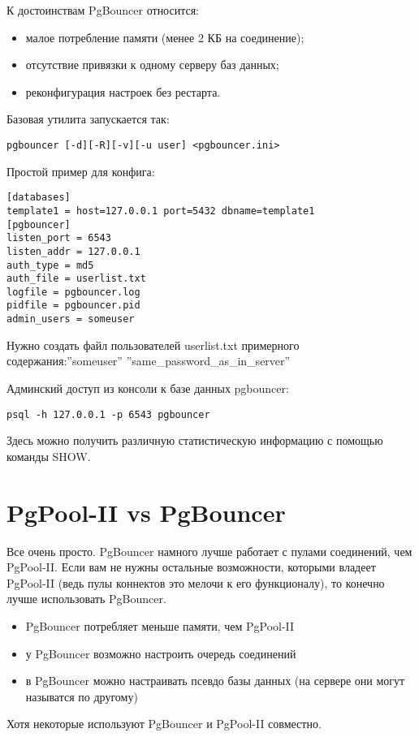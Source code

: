 К достоинствам PgBouncer относится:
\begin{itemize}
\item малое потребление памяти (менее 2 КБ на соединение);
\item отсутствие привязки к одному серверу баз данных;
\item реконфигурация настроек без рестарта.
\end{itemize}

Базовая утилита запускается так:
\begin{lstlisting}[label=lst:pgbouncer1,caption=PgBouncer]
pgbouncer [-d][-R][-v][-u user] <pgbouncer.ini>
\end{lstlisting}

Простой пример для конфига:
\begin{lstlisting}[label=lst:pgbouncer2,caption=PgBouncer]
[databases]
template1 = host=127.0.0.1 port=5432 dbname=template1
[pgbouncer]
listen_port = 6543
listen_addr = 127.0.0.1
auth_type = md5
auth_file = userlist.txt
logfile = pgbouncer.log
pidfile = pgbouncer.pid
admin_users = someuser
\end{lstlisting}

Нужно создать файл пользователей userlist.txt примерного содержания:''someuser'' ''same\_password\_as\_in\_server''

Админский доступ из консоли к базе данных pgbouncer:
\begin{lstlisting}[label=lst:pgbouncer3,caption=PgBouncer]
psql -h 127.0.0.1 -p 6543 pgbouncer
\end{lstlisting}

Здесь можно получить различную статистическую информацию с помощью команды SHOW.

\section{PgPool-II vs PgBouncer}

Все очень просто. PgBouncer намного лучше работает с пулами соединений, чем PgPool-II. Если вам не 
нужны остальные возможности, которыми владеет PgPool-II (ведь пулы коннектов это мелочи к его функционалу), 
то конечно лучше использовать PgBouncer. 
\begin{itemize}
\item PgBouncer потребляет меньше памяти, чем PgPool-II
\item у PgBouncer возможно настроить очередь соединений
\item в PgBouncer можно настраивать псевдо базы данных (на сервере они могут называтся по другому)
\end{itemize}

Хотя некоторые используют PgBouncer и PgPool-II совместно.